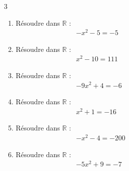 {%
\begin{Exercice}%
\leavevmode\vspace{-\baselineskip}

\begin{multicols}{3}
\begin{enumerate}[itemsep=1em]
	\item \begin{minipage}[t]{\linewidth}Résoudre dans $\mathbb{R}$ :\\
              \,\,\,\,\,\,\,\,\,\,\,\,\,\,\,\,\,\,\,\,\,\,\,\,\,\,\,\,\,\,\,\,\,\,\,\,\,\,\,\,\,\,\,\,\,\,\,\,\,\, $-x^2-5=-5$\\\end{minipage}
	\item \begin{minipage}[t]{\linewidth}Résoudre dans $\mathbb{R}$ :\\
              \,\,\,\,\,\,\,\,\,\,\,\,\,\,\,\,\,\,\,\,\,\,\,\,\,\,\,\,\,\,\,\,\,\,\,\,\,\,\,\,\,\,\,\,\,\,\,\,\,\, $x^2-10=111$\\\end{minipage}
	\item \begin{minipage}[t]{\linewidth}Résoudre dans $\mathbb{R}$ :\\
              \,\,\,\,\,\,\,\,\,\,\,\,\,\,\,\,\,\,\,\,\,\,\,\,\,\,\,\,\,\,\,\,\,\,\,\,\,\,\,\,\,\,\,\,\,\,\,\,\,\, $-9x^2+4=-6$\\\end{minipage}
	\item \begin{minipage}[t]{\linewidth}Résoudre dans $\mathbb{R}$ :\\
              \,\,\,\,\,\,\,\,\,\,\,\,\,\,\,\,\,\,\,\,\,\,\,\,\,\,\,\,\,\,\,\,\,\,\,\,\,\,\,\,\,\,\,\,\,\,\,\,\,\, $x^2+1=-16$\\\end{minipage}
	\item \begin{minipage}[t]{\linewidth}Résoudre dans $\mathbb{R}$ :\\
              \,\,\,\,\,\,\,\,\,\,\,\,\,\,\,\,\,\,\,\,\,\,\,\,\,\,\,\,\,\,\,\,\,\,\,\,\,\,\,\,\,\,\,\,\,\,\,\,\,\, $-x^2-4=-200$\\\end{minipage}
	\item \begin{minipage}[t]{\linewidth}Résoudre dans $\mathbb{R}$ :\\
              \,\,\,\,\,\,\,\,\,\,\,\,\,\,\,\,\,\,\,\,\,\,\,\,\,\,\,\,\,\,\,\,\,\,\,\,\,\,\,\,\,\,\,\,\,\,\,\,\,\, $-5x^2+9=-7$\\\end{minipage}
\end{enumerate}
\end{multicols}
\end{Exercice}

}
